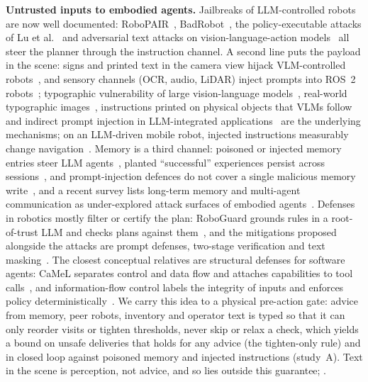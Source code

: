 \documentclass[conference]{IEEEtran}
\begin{document}
\textbf{Untrusted inputs to embodied agents.}
Jailbreaks of LLM-controlled robots are now well documented: RoboPAIR~\cite{robey2025jailbreaking},
BadRobot~\cite{zhang2025badrobot}, the policy-executable attacks of Lu et al.~\cite{lu2024poex} and
adversarial text attacks on vision-language-action models~\cite{jones2025vla} all steer the planner through the instruction channel.
A second line puts the payload in the scene: signs and printed text in the camera view hijack VLM-controlled
robots~\cite{burbano2026chai,samarakoon2026paper}, and sensory channels (OCR, audio, LiDAR) inject prompts into ROS~2 robots~\cite{dorzhiev2026ripa};
typographic vulnerability of large vision-language models~\cite{cheng2024typographic}, real-world typographic images~\cite{westerhoff2025scam}, instructions printed on physical objects that VLMs follow~\cite{ling2026physicalinjection} and indirect prompt injection in
LLM-integrated applications~\cite{greshake2023indirect} are the underlying mechanisms; on an LLM-driven mobile robot, injected instructions measurably change navigation~\cite{zhang2024robotinjection}.
Memory is a third channel: poisoned or injected memory entries steer LLM agents~\cite{chen2024agentpoison,dong2025minja}, planted ``successful'' experiences persist across sessions~\cite{srivastava2025memorygraft}, and prompt-injection defences do not cover a single malicious memory write~\cite{dash2026memorypoisoning}, and a recent survey
lists long-term memory and multi-agent communication as under-explored attack surfaces of embodied agents~\cite{liu2026embodiedsecurity}.
Defenses in robotics mostly filter or certify the plan: RoboGuard grounds rules in a root-of-trust LLM and checks plans against them~\cite{ravichandran2026guardrails},
and the mitigations proposed alongside the attacks are prompt defenses, two-stage verification and text masking~\cite{samarakoon2026paper,lu2024poex}.
The closest conceptual relatives are structural defenses for software agents: CaMeL separates control and data flow and attaches capabilities to tool calls~\cite{debenedetti2025camel},
and information-flow control labels the integrity of inputs and enforces policy deterministically~\cite{costa2025fides}.
We carry this idea to a physical pre-action gate: advice from memory, peer robots, inventory and operator text is typed so that it can only reorder visits or tighten thresholds,
never skip or relax a check, which yields a bound on unsafe deliveries that holds for any advice (the tighten-only rule) and  in closed loop against poisoned memory and injected instructions (study~A).
Text in the scene is perception, not advice, and so lies outside this guarantee; .
\end{document}
